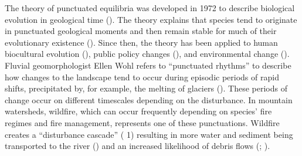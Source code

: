 \documentclass[
]{article}
\begin{document}
The theory of punctuated equilibria was developed in 1972 to describe biological evolution in geological time (). The theory explains that species tend to originate in punctuated geological moments and then remain stable for much of their evolutionary existence (). Since then, the theory has been applied to human biocultural evolution (), public policy changes (), and environmental change (). Fluvial geomorphologist Ellen Wohl refers to ``punctuated rhythms'' to describe how changes to the landscape tend to occur during episodic periods of rapid shifts, precipitated by, for example, the melting of glaciers (). These periods of change occur on different timescales depending on the disturbance. In mountain watersheds, wildfire, which can occur frequently depending on species' fire regimes and fire management, represents one of these punctuations. Wildfire creates a ``disturbance cascade'' ( 1) resulting in more water and sediment being transported to the river () and an increased likelihood of debris flows (; ).
\end{document}
